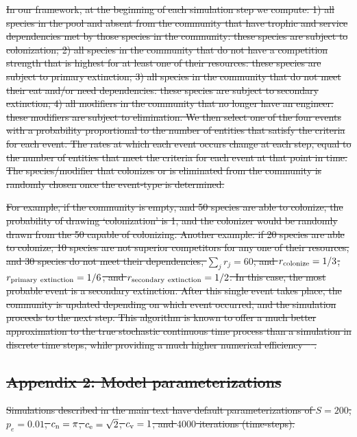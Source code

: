 \documentclass[twocolumn,preprintnumbers,amsmath,amssymb,superscriptaddress,linenumbers]{revtex4-1}
\newcommand{\rr}[1]{{\rm #1}}
\providecommand{\DIFdel}[1]{{\protect\color{red}\sout{#1}}}                      %
\begin{document}
\DIFdel{In our framework, at the beginning of each simulation step we compute:
1) all species in the pool and absent from the community that have trophic and service dependencies met by those species in the community: these species are subject to colonization;
2) all species in the community that do not have a competition strength that is highest for at least one of their resources: these species are subject to primary extinction;
3) all species in the community that do not meet their eat and/or need dependencies: these species are subject to secondary extinction;
4) all modifiers in the community that no longer have an engineer: these modifiers are subject to elimination.
We then select one of the four events with a probability proportional to the number of entities that satisfy the criteria for each event.
The rates at which each event occurs change at each step, equal to the number of entities that meet the criteria for each event at that point in time.
The species/modifier that colonizes or is eliminated from the community is randomly chosen once the event-type is determined.
}%

\DIFdel{For example, if the community is empty, and 50 species are able to colonize, the probability of drawing `colonization' is 1, and the colonizer would be randomly drawn from the 50 capable of colonizing.
Another example: if 20 species are able to colonize, 10 species are not superior competitors for any one of their resources, and 30 species do not meet their dependencies, $\sum_j{r_j} = 60$, and $r_\rr{colonize} = 1/3$, $r_\rr{primary~extinction} = 1/6$, and $r_\rr{secondary~extinction} = 1/2$.
In this case, the most probable event is a secondary extinction.
After this single event takes place, the community is updated depending on which event occurred, and the simulation proceeds to the next step.
This algorithm is known to offer a much better approximation to the true stochastic continuous time process than a simulation in discrete time steps, while providing a much higher numerical efficiency \mbox{%
\cite{Gillespie1977}}\hspace{0pt}%
.
}%

\subsection*{\DIFdel{Appendix 2: Model parameterizations}}
\DIFdel{Simulations described in the main text have default parameterizations of $S=200$, $p_e=0.01$, $c_{\rm n} = \pi$, $c_{\rm e} = \sqrt{2}$, $c_{\rm v} = 1$, and $4000$ iterations (time-steps).
}%
\end{document}
